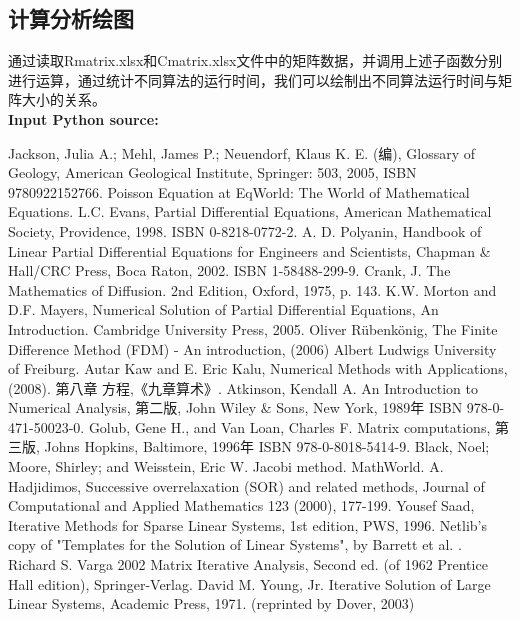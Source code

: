 \documentclass[twoside,twocolumn]{article}
\begin{document}
\begin{CJK*}{UTF8}{gkai}
\begin{appendices}
\section{计算分析绘图}
通过读取Rmatrix.xlsx和Cmatrix.xlsx文件中的矩阵数据，并调用上述子函数分别进行运算，通过统计不同算法的运行时间，我们可以绘制出不同算法运行时间与矩阵大小的关系。\\
\textbf{\textcolor[rgb]{0.98,0.00,0.00}{Input Python source:}}

\end{appendices}


\newpage
\renewcommand\refname{参考文献}
\begin{thebibliography}{99}
 Jackson, Julia A.; Mehl, James P.; Neuendorf, Klaus K. E. (编), Glossary of Geology, American Geological Institute, Springer: 503, 2005, ISBN 9780922152766.
Poisson Equation at EqWorld: The World of Mathematical Equations.
L.C. Evans, Partial Differential Equations, American Mathematical Society, Providence, 1998. ISBN 0-8218-0772-2.
A. D. Polyanin, Handbook of Linear Partial Differential Equations for Engineers and Scientists, Chapman \& Hall/CRC Press, Boca Raton, 2002. ISBN 1-58488-299-9.
Crank, J. The Mathematics of Diffusion. 2nd Edition, Oxford, 1975, p. 143.
K.W. Morton and D.F. Mayers, Numerical Solution of Partial Differential Equations, An Introduction. Cambridge University Press, 2005.
Oliver Rübenkönig, The Finite Difference Method (FDM) - An introduction, (2006) Albert Ludwigs University of Freiburg.
Autar Kaw and E. Eric Kalu, Numerical Methods with Applications, (2008).
 第八章 方程,《九章算术》.
Atkinson, Kendall A. An Introduction to Numerical Analysis, 第二版, John Wiley \& Sons, New York, 1989年 ISBN 978-0-471-50023-0.
Golub, Gene H., and Van Loan, Charles F. Matrix computations, 第三版, Johns Hopkins, Baltimore, 1996年 ISBN 978-0-8018-5414-9.
Black, Noel; Moore, Shirley; and Weisstein, Eric W. Jacobi method. MathWorld.
A. Hadjidimos, Successive overrelaxation (SOR) and related methods, Journal of Computational and Applied Mathematics 123 (2000), 177-199.
Yousef Saad, Iterative Methods for Sparse Linear Systems, 1st edition, PWS, 1996.
Netlib's copy of "Templates for the Solution of Linear Systems", by Barrett et al.
.
Richard S. Varga 2002 Matrix Iterative Analysis, Second ed. (of 1962 Prentice Hall edition), Springer-Verlag.
David M. Young, Jr. Iterative Solution of Large Linear Systems, Academic Press, 1971. (reprinted by Dover, 2003)
\end{thebibliography} 

\end{CJK*}
\end{document}
